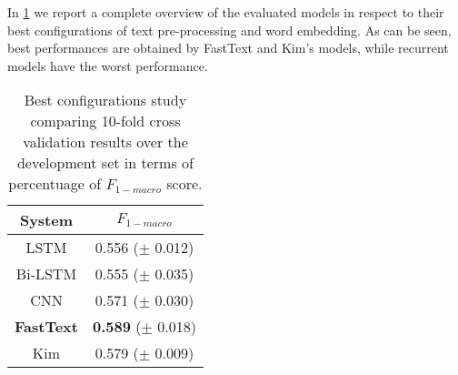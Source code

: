 \begin{comment}
\begin{table}[h]
\footnotesize
\caption{Text representation study comparing 10-fold cross validation results over the development set in terms of percentuage of $F_{1-macro}$ score. The pre-processing setting was fixed at RM+EM.}
\centering
\begin{tabular}{l|ccccc}
\toprule
\multirow{2}{*}{Embedding}	& \multicolumn{5}{ c }{Models}       \\ 
					& CNN		& LSTM		& B-LSTM	& FAST-TEXT	& KIM	\\ 
\hline 
ES static			& \textbf{48,1}		& 36,1		& 38,9		& 36,4		& 43,6\\
CA static			& \textbf{45,1}		& 30,6		& 38,5		& 30,1		& 39,6\\ 
\hline
ES non-static		& \win57,1		& 52,1		& 49,9		& \win54,8		& \win\textbf{58,9}\\
CA non-static		& 53,5		& \win53,6		& 46,3		& 54,1		& \textbf{56,2}\\
\hline
non-static			& 52,6		& 47,3		& \win51,8		& 53,3		& \textbf{54,7}\\
\bottomrule
\end{tabular}
\end{table}
\end{comment}

In \cref{tab:overview} we report a complete overview of the evaluated models in respect to their best configurations of text pre-processing and word embedding. As can be seen, best performances are obtained by FastText and Kim's models, while recurrent models have the worst performance.

\begin{table}[h]
\footnotesize
\caption{Best configurations study comparing 10-fold cross validation results over the development set in terms of percentuage of $F_{1-macro}$ score. }
\label{tab:overview}
\centering
\begin{tabular}{c|c}
\toprule
\hline
System		& $F_{1-macro}$		\\
\hline
LSTM		& 0.556 ($\pm$ 0.012) \\
Bi-LSTM		& 0.555 ($\pm$ 0.035) \\
CNN			& 0.571 ($\pm$ 0.030) \\
\textbf{FastText}	& \textbf{0.589} ($\pm$ 0.018) \\
Kim			& 0.579 ($\pm$ 0.009) \\
\hline
\bottomrule
\end{tabular}
\end{table}


